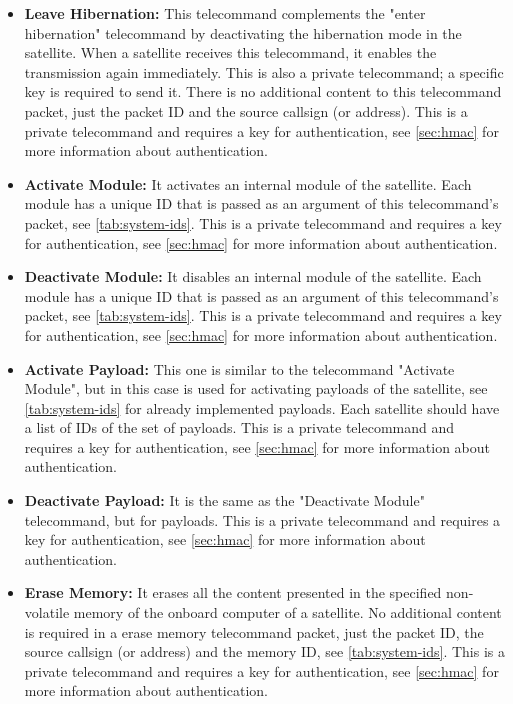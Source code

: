 \begin{itemize}
	\item \textbf{Leave Hibernation:} This telecommand complements the "enter hibernation" telecommand by deactivating the hibernation mode in the satellite. When a satellite receives this telecommand, it enables the transmission again immediately. This is also a private telecommand; a specific key is required to send it. There is no additional content to this telecommand packet, just the packet ID and the source callsign (or address). This is a private telecommand and requires a key for authentication, see \autoref{sec:hmac} for more information about authentication.
    \item \textbf{Activate Module:} It activates an internal module of the satellite. Each module has a unique ID that is passed as an argument of this telecommand's packet, see \autoref{tab:system-ids}. This is a private telecommand and requires a key for authentication, see \autoref{sec:hmac} for more information about authentication.
	\item \textbf{Deactivate Module:} It disables an internal module of the satellite. Each module has a unique ID that is passed as an argument of this telecommand's packet, see \autoref{tab:system-ids}. This is a private telecommand and requires a key for authentication, see \autoref{sec:hmac} for more information about authentication.
	\item \textbf{Activate Payload:} This one is similar to the telecommand "Activate Module", but in this case is used for activating payloads of the satellite, see \autoref{tab:system-ids} for already implemented payloads. Each satellite should have a list of IDs of the set of payloads. This is a private telecommand and requires a key for authentication, see \autoref{sec:hmac} for more information about authentication.
	\item \textbf{Deactivate Payload:} It is the same as the "Deactivate Module" telecommand, but for payloads. This is a private telecommand and requires a key for authentication, see \autoref{sec:hmac} for more information about authentication.
    \item \textbf{Erase Memory:} It erases all the content presented in the specified non-volatile memory of the onboard computer of a satellite. No additional content is required in a erase memory telecommand packet, just the packet ID, the source callsign (or address) and the memory ID, see \autoref{tab:system-ids}. This is a private telecommand and requires a key for authentication, see \autoref{sec:hmac} for more information about authentication.

\end{itemize}
